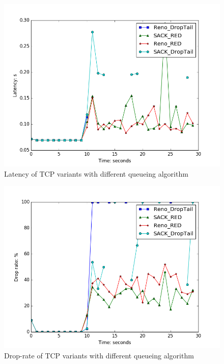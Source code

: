 \documentclass[10pt, conference]{IEEEtran/IEEEtran}
\begin{document}
\begin{figure}[!ht]
\begin{center}
\includegraphics[width=\linewidth]{../exp3/exp3_lat.png}
\caption{Latency of TCP variants with different queueing algorithm}
\label{exp3_lat}
\end{center}
\end{figure}

\begin{figure}[!ht]
\begin{center}
\includegraphics[width=\linewidth]{../exp3/exp3_drop.png}
\caption{Drop-rate of TCP variants with different queueing algorithm}
\label{exp3_drop}
\end{center}
\end{figure}
\end{document}
